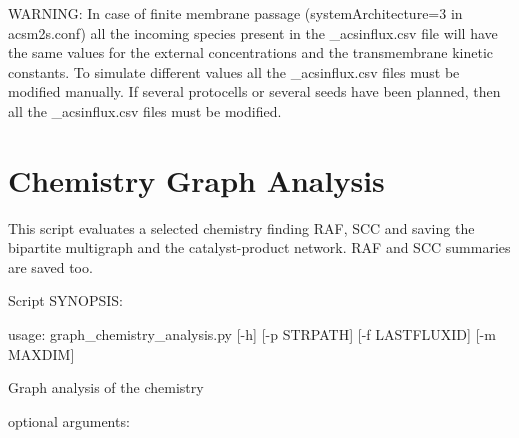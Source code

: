 \documentclass[letterpaper,10pt,english]{sphinxmanual}
\begin{document}
WARNING: In case of finite membrane passage (systemArchitecture=3 in acsm2s.conf) all the incoming species present in the \_acsinflux.csv file 
will have the same values for the external concentrations and the transmembrane kinetic constants. To simulate different values all the \_acsinflux.csv files
must be modified manually. If several protocells or several seeds have been planned, then all the \_acsinflux.csv files must be modified.


\section{Chemistry Graph Analysis}
\label{graph_chemistry_analysis:chemistry-graph-analysis}\label{graph_chemistry_analysis:module-graph_chemistry_analysis}\label{graph_chemistry_analysis::doc}
This script evaluates a selected chemistry finding RAF, SCC and 
saving the bipartite multigraph and the catalyst-product network. 
RAF and SCC summaries are saved too.

Script SYNOPSIS:

usage: graph\_chemistry\_analysis.py {[}-h{]} {[}-p STRPATH{]} {[}-f LASTFLUXID{]} {[}-m MAXDIM{]}

Graph analysis of the chemistry
\begin{description}
\item[{optional arguments:}] \leavevmode{}

\end{description}
\end{document}

